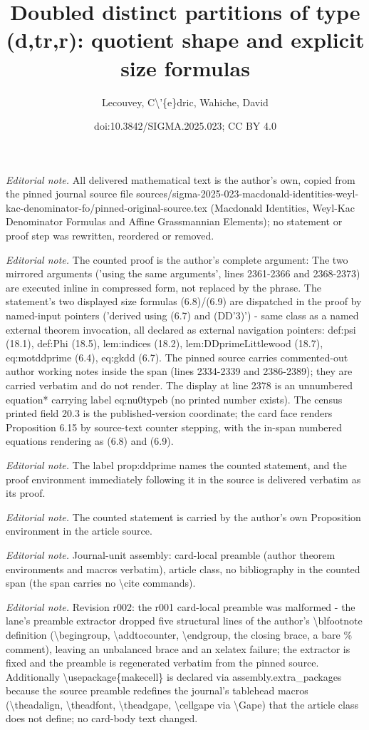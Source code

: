 \documentclass[10pt,a4paper]{article}
\title{Doubled distinct partitions of type (d,tr,r): quotient shape and explicit size formulas}
\author{Lecouvey, C\textbackslash{}'\{e\}dric, Wahiche, David}
\date{doi:10.3842/SIGMA.2025.023; CC BY 4.0}
\numberwithin{equation}{section}
\begin{document}
\maketitle
\setcounter{section}{6}
\setcounter{Theorem}{14}
\setcounter{equation}{7}
\noindent\textit{Editorial note.} All delivered mathematical text is the author's own, copied from the pinned journal source file sources/sigma-2025-023-macdonald-identities-weyl-kac-denominator-fo/pinned-original-source.tex (Macdonald Identities, Weyl-Kac Denominator Formulas and Affine Grassmannian Elements); no statement or proof step was rewritten, reordered or removed.\par\medskip
\noindent\textit{Editorial note.} The counted proof is the author's complete argument: The two mirrored arguments ('using the same arguments', lines 2361-2366 and 2368-2373) are executed inline in compressed form, not replaced by the phrase. The statement's two displayed size formulas (6.8)/(6.9) are dispatched in the proof by named-input pointers ('derived using (6.7) and (DD'3)') - same class as a named external theorem invocation, all declared as external navigation pointers: def:psi (18.1), def:Phi (18.5), lem:indices (18.2), lem:DDprimeLittlewood (18.7), eq:motddprime (6.4), eq:gkdd (6.7). The pinned source carries commented-out author working notes inside the span (lines 2334-2339 and 2386-2389); they are carried verbatim and do not render. The display at line 2378 is an unnumbered equation* carrying label eq:nu0typeb (no printed number exists). The census printed field 20.3 is the published-version coordinate; the card face renders Proposition 6.15 by source-text counter stepping, with the in-span numbered equations rendering as (6.8) and (6.9).\par\medskip
\noindent\textit{Editorial note.} The label prop:ddprime names the counted statement, and the proof environment immediately following it in the source is delivered verbatim as its proof.\par\medskip
\noindent\textit{Editorial note.} The counted statement is carried by the author's own Proposition environment in the article source.\par\medskip
\noindent\textit{Editorial note.} Journal-unit assembly: card-local preamble (author theorem environments and macros verbatim), article class, no bibliography in the counted span (the span carries no \textbackslash{}cite commands).\par\medskip
\noindent\textit{Editorial note.} Revision r002: the r001 card-local preamble was malformed - the lane's preamble extractor dropped five structural lines of the author's \textbackslash{}blfootnote definition (\textbackslash{}begingroup, \textbackslash{}addtocounter, \textbackslash{}endgroup, the closing brace, a bare \% comment), leaving an unbalanced brace and an xelatex failure; the extractor is fixed and the preamble is regenerated verbatim from the pinned source. Additionally \textbackslash{}usepackage\{makecell\} is declared via assembly.extra\_packages because the source preamble redefines the journal's tablehead macros (\textbackslash{}theadalign, \textbackslash{}theadfont, \textbackslash{}theadgape, \textbackslash{}cellgape via \textbackslash{}Gape) that the article class does not define; no card-body text changed.\par\medskip
\end{document}
